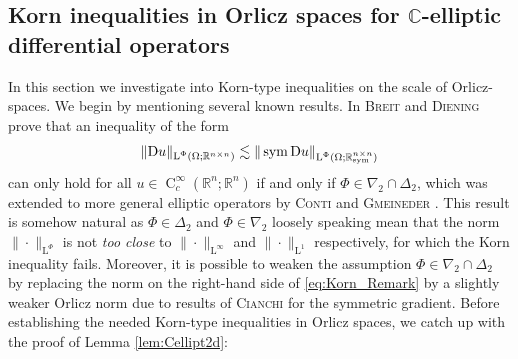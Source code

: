 \documentclass[a4paper,10pt,reqno,oneside]{amsart}
\numberwithin{equation}{section}
\newcommand{\R}{\mathbb R}
\newcommand{\C}{\mathbb C}
\newcommand{\lebe}{\operatorname{L}}
\newcommand{\hold}{\operatorname{C}}
\newcommand{\D}{\mathrm{D}}
\newcommand{\sym}{\operatorname{sym}}
\begin{document}
\subsection{Korn inequalities in Orlicz spaces for $\C$-elliptic differential operators} \label{sec:Korn_in_Orlicz} 
In this section we investigate into Korn-type inequalities on the scale of Orlicz-spaces. We begin by mentioning several known results.  In \cite{BreitDiening_KornOrlicz} \textsc{Breit} and \textsc{Diening} prove that an inequality of the form  
\begin{equation}\label{eq:Korn_Remark}
	\|\D u\|_{\lebe^\Phi(\Omega;\R^{n\times n})}\lesssim \|\sym \D u\|_{\lebe^\Phi(\Omega;\R^{n\times n}_{\rm sym})}
\end{equation}
can only hold for all $u\in\hold^\infty_c(\R^n;\R^{n})$ if and only if $\Phi\in \nabla_2\cap\Delta_2$, which was extended to more general elliptic operators by \textsc{Conti} and \textsc{Gmeineder} \cite{ContiGmeineder}. This result is somehow natural as $\Phi\in\Delta_2$ and $\Phi\in\nabla_2$ loosely speaking mean that the norm $\|\cdot\|_{\lebe^\Phi}$ is not \emph{too close} to $\|\cdot\|_{\lebe^\infty}$ and $\|\cdot\|_{\lebe^1}$ respectively, for which the Korn inequality fails. Moreover, it is possible to weaken the assumption $\Phi\in\nabla_2\cap \Delta_2$ by replacing the norm on the right-hand side of \eqref{eq:Korn_Remark} by a slightly weaker Orlicz norm due to results of \textsc{Cianchi} \cite{Cianchi} for the symmetric gradient.
Before establishing the needed Korn-type inequalities in Orlicz spaces, we catch up with the proof of Lemma \ref{lem:Cellipt2d}:
\end{document}
